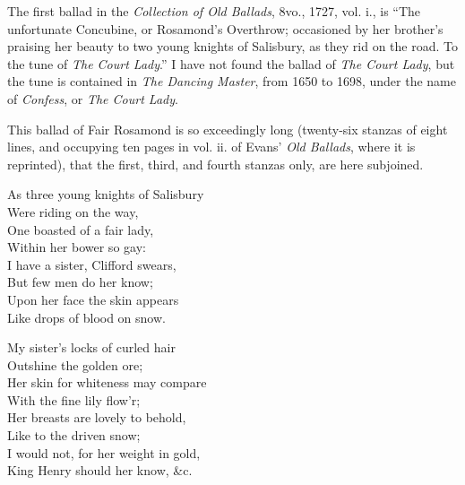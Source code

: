 

The first ballad in the \textit{Collection of Old Ballads}, 8vo., 1727, vol. i., is “The
unfortunate Concubine, or Rosamond’s Overthrow; occasioned by her brother’s
praising her beauty to two young knights of Salisbury, as they rid on the road.
To the tune of \textit{The Court Lady}.” I have not found the ballad of \textit{The Court Lady},
but the tune is contained in \textit{The Dancing Master}, from 1650 to 1698, under the
name of \textit{Confess}, or \textit{The Court Lady}.

This ballad of Fair Rosamond is so exceedingly long (twenty-six stanzas of
eight lines, and occupying ten pages in vol. ii. of Evans’ \textit{Old Ballads}, where it is
reprinted), that the first, third, and fourth stanzas only, are here subjoined.



\settowidth{\versewidth}{As three young knights of Salisbury}
\begin{dcverse}\begin{altverse}
As three young knights of Salisbury\\
Were riding on the way,\\
One boasted of a fair lady,\\
Within her bower so gay:\\
I have a sister, Clifford swears,\\
But few men do her know;\\
Upon her face the skin appears\\
Like drops of blood on snow.
\end{altverse}

\begin{altverse}
My sister’s locks of curled hair\\
Outshine the golden ore;\\
Her skin for whiteness may compare\\
With the fine lily flow’r;\\
Her breasts are lovely to behold,\\
Like to the driven snow;\\
I would not, for her weight in gold,\\
King Henry should her know, \&c.
\end{altverse}
\end{dcverse}
\pagebreak

